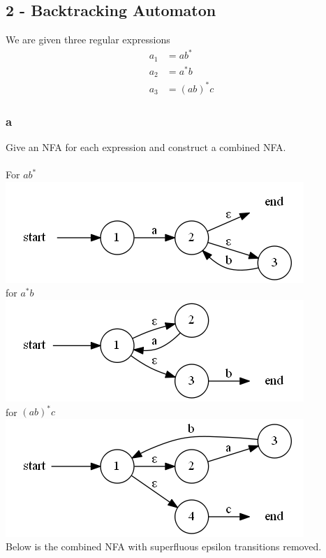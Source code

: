 \documentclass[12pt]{article}
\begin{document}
\newpage

\subsection*{2 - Backtracking Automaton}
We are given three regular expressions
\begin{align*}
a_1 &= ab^*\\
a_2 &= a^*b\\
a_3 &= (ab)^*c
\end{align*}

\subsubsection*{a}
Give an NFA for each expression and construct a combined NFA.\\
\\
For $ab^*$\\
\includegraphics[scale=1]{graph2}\\
for $a^*b$\\
\includegraphics[scale=1]{graph3}\\
for $(ab)^*c$\\
\includegraphics[scale=1]
{graph4}\\
\newpage
Below is the combined NFA with superfluous epsilon transitions removed.\\
\end{document}
